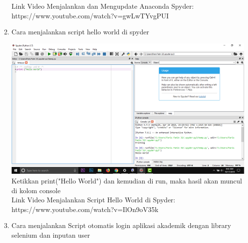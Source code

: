 \begin{enumerate}
Link Video Menjalankan dan Mengupdate Anaconda Spyder: \\
https://www.youtube.com/watch?v=gwLwTYvgPUI

\item Cara menjalankan script hello world di spyder

\includegraphics{gambar/6_1.png}
Ketikkan print("Hello World") dan kemudian di run, maka hasil akan muncul di kolom console\\

Link Video Menjalankan Script Hello World di Spyder: \\
https://www.youtube.com/watch?v=IlOn\textunderscore9oV35k

\item Cara menjalankan Script otomatis login aplikasi akademik dengan library selenium dan inputan user


\end{enumerate}
